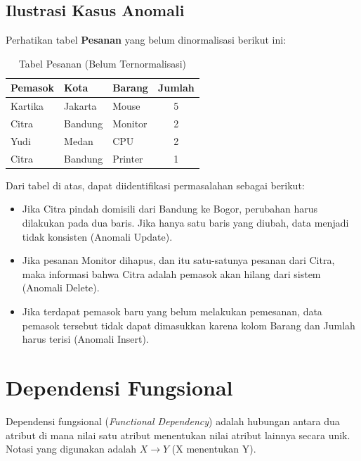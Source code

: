 \documentclass[11pt,a4paper]{article}
\begin{document}
\subsection{Ilustrasi Kasus Anomali}

Perhatikan tabel \textbf{Pesanan} yang belum dinormalisasi berikut ini:

\begin{table}[H]
	\centering
	\small
	\caption{Tabel Pesanan (Belum Ternormalisasi)}
	\begin{tabularx}{0.7\textwidth}{@{} l l l c @{}}
		\toprule
		\textbf{Pemasok} & \textbf{Kota} & \textbf{Barang} & \textbf{Jumlah} \\
		\midrule
		Kartika          & Jakarta       & Mouse           & 5               \\
		Citra            & Bandung       & Monitor         & 2               \\
		Yudi             & Medan         & CPU             & 2               \\
		Citra            & Bandung       & Printer         & 1               \\
		\bottomrule
	\end{tabularx}
\end{table}

Dari tabel di atas, dapat diidentifikasi permasalahan sebagai berikut:
\begin{itemize}
	\item Jika Citra pindah domisili dari Bandung ke Bogor, perubahan harus dilakukan pada dua baris. Jika hanya satu baris yang diubah, data menjadi tidak konsisten (Anomali Update).
	\item Jika pesanan Monitor dihapus, dan itu satu-satunya pesanan dari Citra, maka informasi bahwa Citra adalah pemasok akan hilang dari sistem (Anomali Delete).
	\item Jika terdapat pemasok baru yang belum melakukan pemesanan, data pemasok tersebut tidak dapat dimasukkan karena kolom Barang dan Jumlah harus terisi (Anomali Insert).
\end{itemize}

\section{Dependensi Fungsional}

Dependensi fungsional (\textit{Functional Dependency}) adalah hubungan antara dua atribut di mana nilai satu atribut menentukan nilai atribut lainnya secara unik. Notasi yang digunakan adalah \(X \rightarrow Y\) (X menentukan Y).
\end{document}
